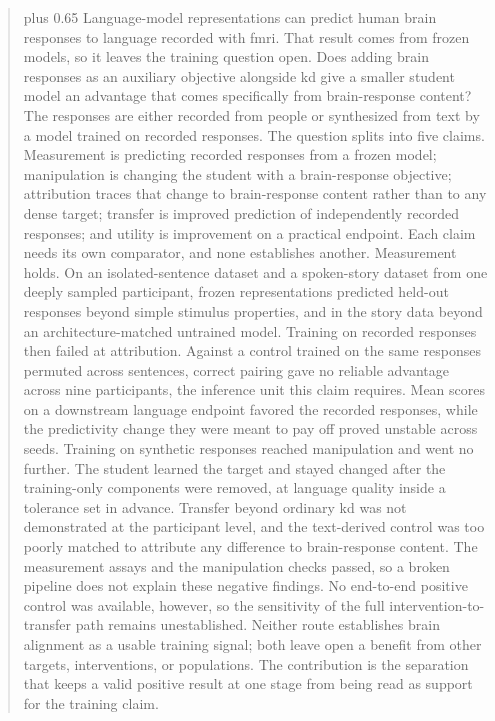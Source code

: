 \documentclass{article}
\begin{document}
\begin{abstract}
\parfillskip=0pt plus 0.65\linewidth %
Language-model representations can predict human brain responses to language recorded with \ac{fmri}.
That result comes from frozen models, so it leaves the training question open.
Does adding brain responses as an auxiliary objective alongside \ac{kd} give a smaller student model an advantage that comes specifically from brain-response content?
The responses are either recorded from people or synthesized from text by a model trained on recorded responses.
The question splits into five claims.
Measurement is predicting recorded responses from a frozen model; manipulation is changing the student with a brain-response objective; attribution traces that change to brain-response content rather than to any dense target; transfer is improved prediction of independently recorded responses; and utility is improvement on a practical endpoint.
Each claim needs its own comparator, and none establishes another.
Measurement holds.
On an isolated-sentence dataset and a spoken-story dataset from one deeply sampled participant, frozen representations predicted held-out responses beyond simple stimulus properties, and in the story data beyond an architecture-matched untrained model.
Training on recorded responses then failed at attribution.
Against a control trained on the same responses permuted across sentences, correct pairing gave no reliable advantage across nine participants, the inference unit this claim requires.
Mean scores on a downstream language endpoint favored the recorded responses, while the predictivity change they were meant to pay off proved unstable across seeds.
Training on synthetic responses reached manipulation and went no further.
The student learned the target and stayed changed after the training-only components were removed, at language quality inside a tolerance set in advance.
Transfer beyond ordinary \ac{kd} was not demonstrated at the participant level, and the text-derived control was too poorly matched to attribute any difference to brain-response content.
The measurement assays and the manipulation checks passed, so a broken pipeline does not explain these negative findings.
No end-to-end positive control was available, however, so the sensitivity of the full intervention-to-transfer path remains unestablished.
Neither route establishes brain alignment as a usable training signal; both leave open a benefit from other targets, interventions, or populations.
The contribution is the separation that keeps a valid positive result at one stage from being read as support for the training claim.
\end{abstract}
\acresetall
\end{document}
